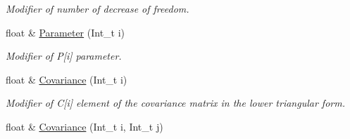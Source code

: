 \begin{DoxyCompactItemize}
\begin{DoxyCompactList}\small\item\em Modifier of number of decrease of freedom. \end{DoxyCompactList}\item 
float \& \hyperlink{classKFParticleBase_abc604c21e1ce236d94df866a3f8fb12e}{Parameter} (Int\+\_\+t i)\hypertarget{classKFParticleBase_abc604c21e1ce236d94df866a3f8fb12e}{}\label{classKFParticleBase_abc604c21e1ce236d94df866a3f8fb12e}

\begin{DoxyCompactList}\small\item\em Modifier of P\mbox{[}i\mbox{]} parameter. \end{DoxyCompactList}\item 
float \& \hyperlink{classKFParticleBase_af4cbf91f41e9dfb36faacf7f500ceb4b}{Covariance} (Int\+\_\+t i)\hypertarget{classKFParticleBase_af4cbf91f41e9dfb36faacf7f500ceb4b}{}\label{classKFParticleBase_af4cbf91f41e9dfb36faacf7f500ceb4b}

\begin{DoxyCompactList}\small\item\em Modifier of C\mbox{[}i\mbox{]} element of the covariance matrix in the lower triangular form. \end{DoxyCompactList}\item 
float \& \hyperlink{classKFParticleBase_a44abe1d32cd0049c6ff251dda1952a6c}{Covariance} (Int\+\_\+t i, Int\+\_\+t j)\hypertarget{classKFParticleBase_a44abe1d32cd0049c6ff251dda1952a6c}{}\label{classKFParticleBase_a44abe1d32cd0049c6ff251dda1952a6c}


\end{DoxyCompactItemize}

